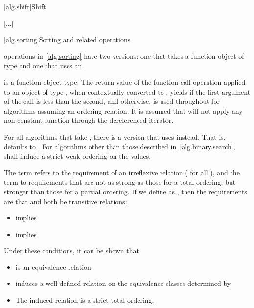 [alg.shift]{Shift}

[...]


[alg.sorting]{Sorting and related operations}

\pnum
{} operations in~\ref{alg.sorting} 
have two versions: one that takes a function object of type
and one that uses an
.

\pnum
{}
is a function object
type. The return value of the function call operation applied to
an object of type , when contextually converted to
,
yields  if the first argument of the call
is less than the second, and
otherwise.
is used throughout for algorithms assuming an ordering relation.
It is assumed that
will not apply any non-constant function through the dereferenced iterator.

\pnum
For all algorithms that take
,
there is a version that uses
instead.
That is,
defaults to
.
For algorithms other than those described in~\ref{alg.binary.search},
 shall induce a strict weak ordering on the values.


\pnum
The term
refers to the
requirement of an irreflexive relation ( for all ),
and the term
to requirements that are not as strong as
those for a total ordering,
but stronger than those for a partial
ordering.
If we define
as
,
then the requirements are that
and
both be transitive  relations:

\begin{itemize}
\item
{}
implies
\item
{}
implies
\end{itemize}
\begin{note}
Under these conditions, it can be shown that
\begin{itemize}
\item
{}
is an equivalence relation
\item
{}
induces a well-defined relation on the equivalence
classes determined by
\item
The induced relation is a strict total ordering.
\end{itemize}
\end{note}

